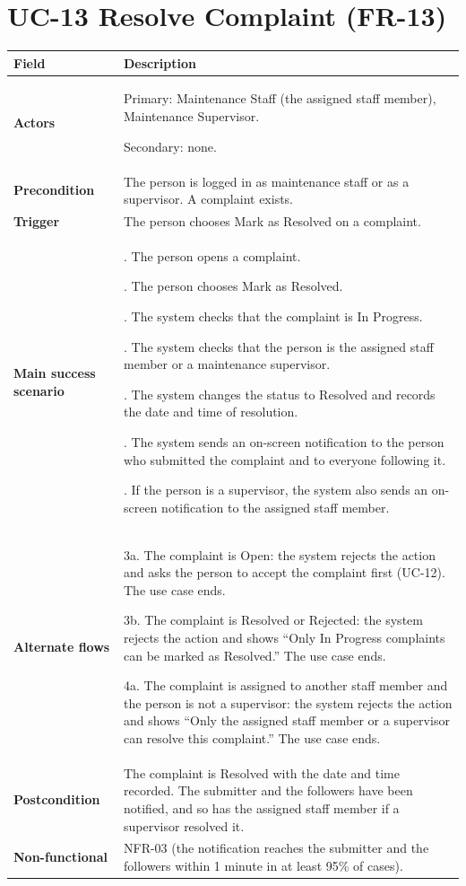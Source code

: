 \documentclass[11pt,a4paper]{report}
\begin{document}
\section{UC-13 Resolve Complaint (FR-13)}
\begin{longtable}{|>{\raggedright\arraybackslash}p{3.0cm}|>{\raggedright\arraybackslash}p{12.4cm}|}
\hline \textbf{Field} & \textbf{Description} \\ \hline \endhead
\textbf{Actors} & Primary: Maintenance Staff (the assigned staff member), Maintenance Supervisor.\par\smallskip Secondary: none. \\ \hline
\textbf{Precondition} & The person is logged in as maintenance staff or as a supervisor. A complaint exists. \\ \hline
\textbf{Trigger} & The person chooses Mark as Resolved on a complaint. \\ \hline
\textbf{Main success scenario} & 1. The person opens a complaint.\par\smallskip 2. The person chooses Mark as Resolved.\par\smallskip 3. The system checks that the complaint is In Progress.\par\smallskip 4. The system checks that the person is the assigned staff member or a maintenance supervisor.\par\smallskip 5. The system changes the status to Resolved and records the date and time of resolution.\par\smallskip 6. The system sends an on-screen notification to the person who submitted the complaint and to everyone following it.\par\smallskip 7. If the person is a supervisor, the system also sends an on-screen notification to the assigned staff member. \\ \hline
\textbf{Alternate flows} & 3a. The complaint is Open: the system rejects the action and asks the person to accept the complaint first (UC-12). The use case ends.\par\smallskip 3b. The complaint is Resolved or Rejected: the system rejects the action and shows ``Only In Progress complaints can be marked as Resolved.'' The use case ends.\par\smallskip 4a. The complaint is assigned to another staff member and the person is not a supervisor: the system rejects the action and shows ``Only the assigned staff member or a supervisor can resolve this complaint.'' The use case ends. \\ \hline
\textbf{Postcondition} & The complaint is Resolved with the date and time recorded. The submitter and the followers have been notified, and so has the assigned staff member if a supervisor resolved it. \\ \hline
\textbf{Non-functional} & NFR-03 (the notification reaches the submitter and the followers within 1 minute in at least 95\% of cases). \\ \hline
\end{longtable}
\end{document}
